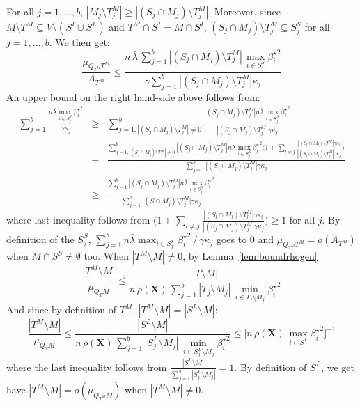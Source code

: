 \documentclass[aos]{imsart}
\theoremstyle{plain}
\newcommand{\bs}{\boldsymbol}
\begin{document}
For all $j=1,\ldots,b$, $|M_j \setminus T^M_j| \geq |(S_j\cap M_j )\setminus T^M_j|$. Moreover, since  $M\setminus T^M\subseteq V\setminus (S^I \cup S^L)$ and $T^M\cap S^I=M\cap S^I$, $(S_j\cap M_j )\setminus T^M_j \subseteq S^S_j$ for all $j=1,\ldots,b$. We then get:
$$\frac{\mu_{Q_{T^M} T^M}}{ A_{T^M}} \leq \frac{n\,\bar{\lambda}\,\sum_{j=1}^b|(S_j\cap M_j )\setminus T^M_j|\,\max_{i\in S^S_j}{\beta_{i}^{\star}}^2}{ \gamma\sum_{j=1}^b|(S_j\cap M_j ) \setminus T^M_j|\kappa_j}$$
An upper bound on the right hand-side above follows from:
\begin{eqnarray*}
    \sum_{j=1}^b\frac{n\bar{\lambda}\max_{i\in S^S_j}{\beta_i^{\star}}^2}{\gamma\kappa_j}
    &\geq &\sum_{j=1,|(S_j\cap M_j )\setminus T^M_j|\neq 0}^b\frac{|(S_j\cap M_j )\setminus T^M_j|n\bar{\lambda}\max_{i\in S^S_j}{\beta_i^{\star}}^2}{|(S_j\cap M_j )\setminus T^M_j|\gamma\kappa_j} \\
    &=& \frac{\sum_{j=1,|(S_j\cap M_j )\setminus T^M_j|\neq 0 }^b|(S_j\cap M_j )\setminus T^M_j|n\bar{\lambda}\max_{i\in S^S_j}{\beta_i^{\star}}^2\Big(1+\sum_{l\neq j}\frac{|(S_l\cap M_l)\setminus T^M_l|\gamma\kappa_l}{|(S_j\cap M_j )\setminus T^M_j|\gamma\kappa_j}\Big)}{\sum_{j=1}^b|(S_j\cap M_j )\setminus T^M_j|\gamma\kappa_j} \\
    &\geq & \frac{\sum_{j=1}^b|(S_j\cap M_j )\setminus T^M_j|n\bar{\lambda}\max_{i\in S^S_j}{\beta_i^{\star}}^2}{\sum_{j=1}^b \big|(S\cap M_j)\setminus T^M_j\big|\gamma\kappa_j} 
\end{eqnarray*}
where last inequality follows from $\Big(1+\sum_{l\neq j}\frac{|(S_l\cap M_l)\setminus T^M_l|\gamma\kappa_l}{|(S_j\cap M_j )\setminus T^M_j|\gamma\kappa_j}\Big)\geq 1$ for all $j$. By definition of the $S_j^S$, $\sum_{j=1}^b n\bar{\lambda}\max_{i\in S^S_j}{\beta_i^{\star}}^2\,/\,\gamma\kappa_j$ goes to 0 and $\mu_{Q_{T^M} T^M}=o(A_{T^M})$ when $M\cap S^S\neq\emptyset$ too. When $|T^M\setminus M|\neq0$, by Lemma~\ref{lem:boundrhogen}
$$\frac{|T^M\setminus M|}{\mu_{Q_TM}} \leq \frac{|T\setminus M|}{n\,\rho(\bs X)\,\sum_{j=1}^b|T_j\setminus M_j|\,\min_{i\in T_j\setminus M_j}{\beta_{i}^{\star}}^2} $$
And since by definition of $T^M$, $|T^M\setminus M| = |S^L\setminus M|$:
$$\frac{|T^M\setminus M|}{\mu_{Q_TM}} \leq \frac{|S^L\setminus M|}{n\,\rho(\bs X)\,\sum_{j=1}^b|S^L_j\setminus M_j|\,\min_{i\in S^L_j\setminus M_j}{\beta_{i}^{\star}}^2}\leq \Big[n\,\rho(\bs X)\,\max_{i \in S^L}{\beta_{i}^{\star}}^2\Big]^{-1}  $$
where the last inequality follows from $\frac{|S^L\setminus M|}{\sum_{j=1}^b|S^L_j \setminus M_j|}=1$. By definition of $S^L$, we get have $|T^M\setminus M|=o(\mu_{Q_{T^M}M})$ when $|T^M\setminus M|\neq 0$.
\end{document}

